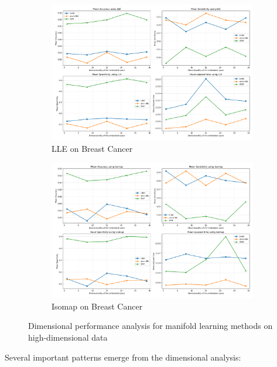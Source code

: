 \documentclass[review]{elsarticle}
\begin{document}
\begin{figure}[H]
\centering
\begin{subfigure}[b]{0.48\textwidth}
\includegraphics[width=\textwidth]{../python/results/plots/Mean_Results_LLE_Data_BreastCancer.pdf}
\caption{LLE on Breast Cancer}
\end{subfigure}
\hfill
\begin{subfigure}[b]{0.48\textwidth}
\includegraphics[width=\textwidth]{../python/results/plots/Mean_Results_Isomap_Data_BreastCancer.pdf}
\caption{Isomap on Breast Cancer}
\end{subfigure}
\caption{Dimensional performance analysis for manifold learning methods on high-dimensional data}
\label{fig:dimensional_trends}
\end{figure}

Several important patterns emerge from the dimensional analysis:
\end{document}
